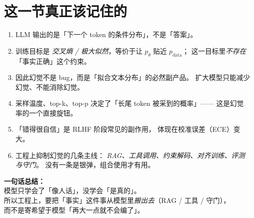 \documentclass[11pt,a4paper]{ctexart}
\begin{document}
\section{这一节真正该记住的}

\begin{enumerate}[label=\textbf{\arabic*.}]
  \item LLM 输出的是「下一个 token 的条件分布」，不是「答案」。
  \item 训练目标是 \emph{交叉熵 / 极大似然}，等价于让 $p_\theta$ 贴近 $p_{\text{data}}$；
        这一目标里\emph{不存在}「事实正确」这个约束。
  \item 因此幻觉不是 bug，而是「拟合文本分布」的必然副产品。
        扩大模型只能减少幻觉、不能消除幻觉。
  \item 采样温度、top-k、top-p 决定了「长尾 token 被采到的概率」——
        这是幻觉率的一个直接旋钮。
  \item 「错得很自信」是 RLHF 阶段常见的副作用，
        体现在校准误差（ECE）变大。
  \item 工程上抑制幻觉的几条主线：
        \emph{RAG、工具调用、约束解码、对齐训练、评测与守门}。
        没有一条是银弹，组合使用才有用。
\end{enumerate}

\begin{keypointblock}
\textbf{一句话总结：}\\
模型只学会了「像人话」，没学会「是真的」。\\
所以工程上，要把「事实」这件事从模型里\emph{搬出去}（RAG / 工具 / 守门），\\
而不是寄希望于模型「再大一点就不会编了」。
\end{keypointblock}
\end{document}
